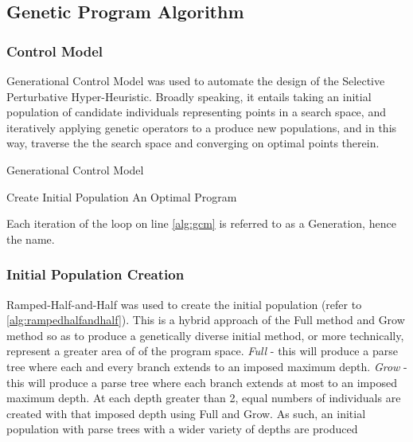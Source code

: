 \documentclass[a4paper,12pt]{article}
\begin{document}
    \subsection{Genetic Program Algorithm}
        \subsubsection*{Control Model} \label{subsubsec:controlmodel}
            \par{
                \noindent 
                Generational Control Model was used to automate the design of the Selective Perturbative Hyper-Heuristic. Broadly speaking, 
                it entails taking an initial population of candidate individuals representing points in a search space, and iteratively applying 
                genetic operators to a produce new populations, and in this way, traverse the the search space and converging on optimal points therein.  
                \newline     
                \begin{algorithm}[H]
                    \caption{Generational Control Model}
                    \SetAlgoLined
                    Create Initial Population\;
                    \Return An Optimal Program \; 
                   
                    
                \end{algorithm}
                \noindent Each iteration of the loop on line \ref{alg:gcm} is referred to as a Generation, hence the name. 
            }
        \subsubsection*{Initial Population Creation}
            \par{
                \noindent 
                Ramped-Half-and-Half was used to create the initial population (refer to \ref{alg:rampedhalfandhalf}). This is a hybrid approach of the Full method and Grow method so as to produce 
                a genetically diverse initial method, or more technically, represent a greater area of of the program space.\newline 
                \newline 
                \textit{Full} - this will produce a parse tree where each and every branch extends to an imposed maximum depth.\newline  
                \textit{Grow} - this will produce a parse tree where each branch extends at most to an imposed maximum depth. \newline 
                \newline 
                At each depth greater than 2, equal numbers of individuals are created with that imposed depth using Full and Grow. As such, an initial population with 
                parse trees with a wider variety of depths are produced
            }
        \newpage
\end{document}
